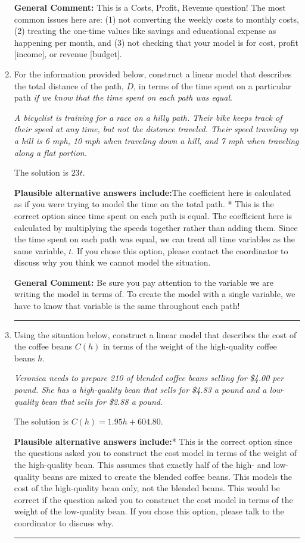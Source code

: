 \documentclass{extbook}[14pt]
\newcommand{\litem}[1]{\item #1

\rule{\textwidth}{0.4pt}}
\begin{document}
\begin{enumerate}
{\textbf{General Comment:} This is a Costs, Profit, Revenue question! The most common issues here are: (1) not converting the weekly costs to monthly costs, (2) treating the one-time values like savings and educational expense as happening per month, and (3) not checking that your model is for cost, profit [income], or revenue [budget].
}
\litem{
For the information provided below, construct a linear model that describes the total distance of the path, $D$, in terms of the time spent on a particular path \textit{if we know that the time spent on each path was equal}.

\begin{center}
    \textit{ A bicyclist is training for a race on a hilly path. Their bike keeps track of their speed at any time, but not the distance traveled. Their speed traveling up a hill is 6 mph, 10 mph when traveling down a hill, and 7 mph when traveling along a flat portion. }
\end{center}
The solution is \( 23 t \).\begin{enumerate}[label=\Alph*.]
\textbf{Plausible alternative answers include:}The coefficient here is calculated as if you were trying to model the time on the total path.
* This is the correct option since time spent on each path is equal.
The coefficient here is calculated by multiplying the speeds together rather than adding them.
Since the time spent on each path was equal, we can treat all time variables as the same variable, $t$.
If you chose this option, please contact the coordinator to discuss why you think we cannot model the situation.
\end{enumerate}

\textbf{General Comment:} Be sure you pay attention to the variable we are writing the model in terms of. To create the model with a single variable, we have to know that variable is the same throughout each path!
}
\litem{
Using the situation below, construct a linear model that describes the cost of the coffee beans $C(h)$ in terms of the weight of the high-quality coffee beans $h$.

\begin{center}
    \textit{ Veronica needs to prepare 210 of blended coffee beans selling for \$4.00 per pound. She has a high-quality bean that sells for \$4.83 a pound and a low-quality bean that sells for \$2.88 a pound. }
\end{center}
The solution is \( C(h) = 1.95 h + 604.80 \).\begin{enumerate}[label=\Alph*.]
\textbf{Plausible alternative answers include:}* This is the correct option since the questions asked you to construct the cost model in terms of the weight of the high-quality bean.
This assumes that exactly half of the high- and low- quality beans are mixed to create the blended coffee beans.
This models the cost of the high-quality bean only, not the blended beans.
This would be correct if the question asked you to construct the cost model in terms of the weight of the low-quality bean.
If you chose this option, please talk to the coordinator to discuss why.
\end{enumerate}

}
\end{enumerate}
\end{document}

